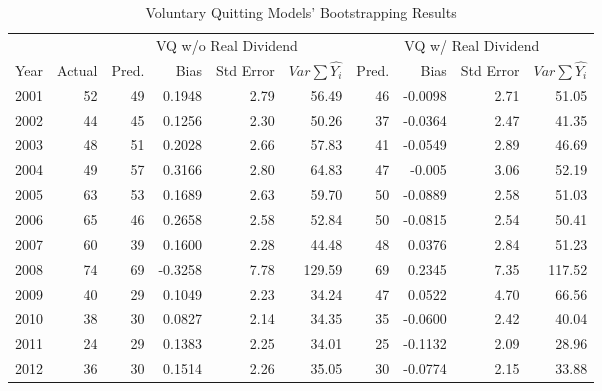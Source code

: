 \begin{table}[]
	\centering
	\scriptsize
	\caption{Voluntary Quitting Models' Bootstrapping Results}
	\label{tab:bootvq}
	\begin{tabular}{lrrrrrrrrr}
		\toprule
		&        & \multicolumn{4}{c}{VQ w/o Real Dividend}                                 & \multicolumn{4}{c}{VQ w/ Real Dividend}                                   \\ 
		Year & Actual & Pred.& Bias    & Std Error & $Var\sum{\hat{Y_i}}$        & Pred. & Bias    & Std Error & $Var\sum{\hat{Y_i}}$          \\ \midrule
		2001                 & 52     & 49              & 0.1948  & 2.79                & 56.49               & 46              & -0.0098 & 2.71       & 51.05               \\
		2002                 & 44     & 45              & 0.1256  & 2.30                 & 50.26               & 37              & -0.0364 & 2.47       & 41.35               \\
		2003                 & 48     & 51              & 0.2028  & 2.66                & 57.83               & 41              & -0.0549 & 2.89       & 46.69               \\
		2004                 & 49     & 57              & 0.3166  & 2.80                 & 64.83               & 47              & -0.005  & 3.06       & 52.19               \\
		2005                 & 63     & 53              & 0.1689  & 2.63                & 59.70                & 50              & -0.0889 & 2.58       & 51.03               \\
		2006                 & 65     & 46              & 0.2658  & 2.58                & 52.84               & 50              & -0.0815 & 2.54       & 50.41               \\
		2007                 & 60     & 39              & 0.1600  & 2.28                & 44.48               & 48              & 0.0376  & 2.84       & 51.23               \\
		2008                 & 74     & 69              & -0.3258 & 7.78                & 129.59              & 69              & 0.2345  & 7.35       & 117.52              \\
		2009                 & 40     & 29              & 0.1049  & 2.23                & 34.24               & 47              & 0.0522  & 4.70        & 66.56               \\
		2010                 & 38     & 30              & 0.0827  & 2.14                & 34.35               & 35              & -0.0600   & 2.42       & 40.04               \\
		2011                 & 24     & 29              & 0.1383  & 2.25                & 34.01               & 25              & -0.1132 & 2.09       & 28.96               \\
		2012                 & 36     & 30              & 0.1514  & 2.26                & 35.05               & 30              & -0.0774 & 2.15       & 33.88            
		\\ \bottomrule		     
	\end{tabular}
\end{table}

